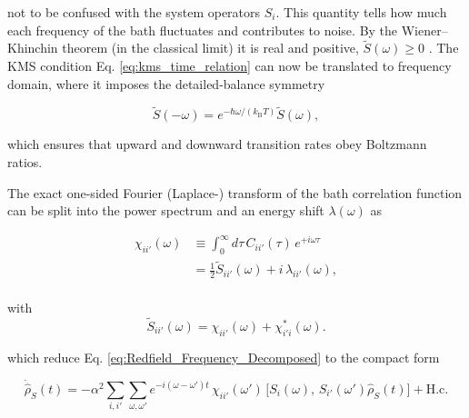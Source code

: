 \noindent
not to be confused with the system operators $S_i$.
This quantity tells how much each frequency of the bath fluctuates and contributes to noise. 
By the Wiener–Khinchin theorem (in the classical limit) it is real and positive, $\tilde{S}(\omega) \geq 0$ .
The KMS condition Eq. \eqref{eq:kms_time_relation} can now be translated to frequency domain, where it imposes the detailed-balance symmetry

\begin{equation}
	\tilde{S}(-\omega) = e^{-\hbar\omega/(k_{\mathrm{B}} T)} \tilde{S}(\omega),
	\label{eq:kms_spectral_relation}
\end{equation}

\noindent
which ensures that upward and downward transition rates obey Boltzmann ratios.


\vspace{1em}
\noindent
The exact one-sided Fourier (Laplace-) transform of the bath correlation function can be split into the power spectrum and an energy shift $ \lambda(\omega)$ as

\begin{align}
	\chi_{ii'}(\omega) &\equiv \int_0^{\infty} d\tau\, C_{ii'}(\tau)\, e^{+i \omega \tau} \\
					   &= \tfrac{1}{2}\tilde{S}_{ii'}(\omega)+i\,\lambda_{ii'}(\omega), \\
\end{align}

\noindent
with 
\begin{equation}
	\tilde{S}_{ii'}(\omega)=\chi_{ii'}(\omega)+\chi_{i'i}^*(\omega).
	\label{eq:Redfield_Rates_Definition}
\end{equation}

\noindent
which reduce Eq. \eqref{eq:Redfield_Frequency_Decomposed} to the compact form

\begin{equation}
	\boxed{
	\dot{\hat{\rho}}_S(t)
	= -\alpha^2 \sum_{i,i'} \sum_{\omega,\omega'} e^{-i(\omega - \omega')t}
	\, \chi_{ii'}(\omega') \,
	\big[ S_i(\omega),\, S_{i'}(\omega') \hat{\rho}_S(t) \big]
	+ \text{H.c.}
	}
\end{equation}


